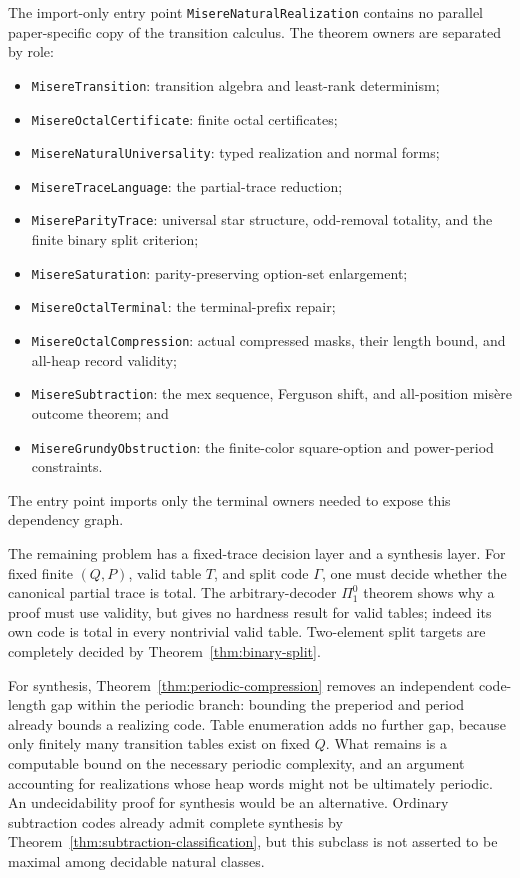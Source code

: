 \documentclass[11pt]{article}
\theoremstyle{definition}
\theoremstyle{remark}
\begin{document}
The import-only entry point \texttt{MisereNaturalRealization} contains no
parallel paper-specific copy of the transition calculus.  The theorem owners
are separated by role:
\begin{itemize}
  \item \texttt{MisereTransition}: transition algebra and least-rank
        determinism;
  \item \texttt{MisereOctalCertificate}: finite octal certificates;
  \item \texttt{MisereNaturalUniversality}: typed realization and normal
        forms;
  \item \texttt{MisereTraceLanguage}: the partial-trace reduction;
  \item \texttt{MisereParityTrace}: universal star structure, odd-removal
        totality, and the finite binary split criterion;
  \item \texttt{MisereSaturation}: parity-preserving option-set enlargement;
  \item \texttt{MisereOctalTerminal}: the terminal-prefix repair;
  \item \texttt{MisereOctalCompression}: actual compressed masks, their length
        bound, and all-heap record validity;
  \item \texttt{MisereSubtraction}: the mex sequence, Ferguson shift, and
        all-position mis\`ere outcome theorem; and
  \item \texttt{MisereGrundyObstruction}: the finite-color square-option
        and power-period constraints.
\end{itemize}
The entry point imports only the terminal owners needed to expose this
dependency graph.

The remaining problem has a fixed-trace decision layer and a synthesis layer.
For fixed finite $(Q,P)$, valid table $T$, and split code $\Gamma$, one must
decide whether the canonical partial trace is total.  The arbitrary-decoder
$\Pi^0_1$ theorem shows why a proof must use validity, but gives no hardness
result for valid tables; indeed its own code is total in every nontrivial
valid table.  Two-element split targets are completely decided by
Theorem~\ref{thm:binary-split}.

For synthesis, Theorem~\ref{thm:periodic-compression} removes an independent
code-length gap within the periodic branch: bounding the preperiod and period
already bounds a realizing code.  Table enumeration adds no further gap,
because only finitely many transition tables exist on fixed $Q$.
What remains is a computable bound on the necessary periodic complexity,
and an argument accounting for realizations whose heap words might not be
ultimately periodic.  An undecidability proof for synthesis would be an
alternative.  Ordinary subtraction codes already admit complete synthesis by
Theorem~\ref{thm:subtraction-classification}, but this subclass is not
asserted to be maximal among decidable natural classes.
\end{document}
